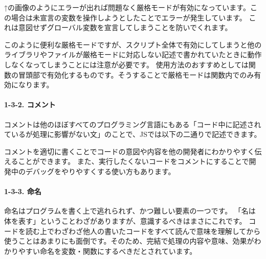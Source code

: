 ↑の画像のようにエラーが出れば問題なく厳格モードが有効になっています。この場合は未宣言の変数を操作しようとしたことでエラーが発生しています。
これは意図せずグローバル変数を宣言してしまうことを防いでくれます。

このように便利な厳格モードですが、スクリプト全体で有効にしてしまうと他のライブラリやファイルが厳格モードに対応しない記述で書かれていたときに動作しなくなってしまうことには注意が必要です。
使用方法のおすすめとしては関数の冒頭部で有効化するものです。そうすることで厳格モードは関数内でのみ有効になります。

\paragraph{1-3-2. コメント}\label{ux30b3ux30e1ux30f3ux30c8}

コメントは他のほぼすべてのプログラミング言語にもある「コード中に記述されているが処理に影響がない文」のことで、JSでは以下の二通りで記述できます。

\begin{Shaded}
\begin{Highlighting}[]
\NormalTok{(}\NormalTok{)}\OperatorTok{;}
\NormalTok{(}\NormalTok{)}\OperatorTok{;}

\CommentTok{/**}
\CommentTok{ */}
\end{Highlighting}
\end{Shaded}

コメントを適切に書くことでコードの意図や内容を他の開発者にわかりやすく伝えることができます。
また、実行したくないコードをコメントにすることで開発中のデバッグをやりやすくする使い方もあります。

\paragraph{1-3-3. 命名}\label{ux547dux540d}

命名はプログラムを書く上で逃れられず、かつ難しい要素の一つです。
「名は体を表す」ということわざがありますが、意識するべきはまさにこれです。
コードを読む上でわざわざ他人の書いたコードをすべて読んで意味を理解してから使うことはあまりにも面倒です。そのため、完結で処理の内容や意味、効果がわかりやすい命名を変数・関数にするべきだとされています。

